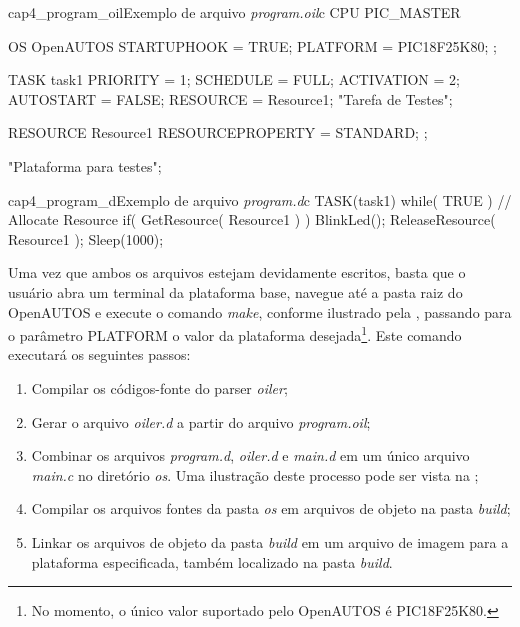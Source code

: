 \begin{algoritmo}{cap4_program_oil}{Exemplo de arquivo \emph{program.oil}}{c}
CPU PIC_MASTER {
	OS OpenAUTOS {
		STARTUPHOOK = TRUE;
		PLATFORM = PIC18F25K80;
	};
	
	TASK task1 {
		PRIORITY = 1;
		SCHEDULE = FULL;
		ACTIVATION = 2;
		AUTOSTART = FALSE;
		RESOURCE = Resource1;
	} "Tarefa de Testes";
	
	RESOURCE Resource1 {
		RESOURCEPROPERTY = STANDARD;
	};
} "Plataforma para testes";
\end{algoritmo}

\begin{algoritmo}{cap4_program_d}{Exemplo de arquivo \emph{program.d}}{c}
TASK(task1) {
	while( TRUE ) {
		// Allocate Resource
		if( GetResource( Resource1 ) ) {
			BlinkLed();
			ReleaseResource( Resource1 );
		}
		Sleep(1000);
	}	
}
\end{algoritmo}

Uma vez que ambos os arquivos estejam devidamente escritos, basta que o usuário abra um terminal da plataforma base, navegue até a pasta raiz do OpenAUTOS e execute o comando \emph{make}, conforme ilustrado pela , passando para o parâmetro PLATFORM o valor da plataforma desejada\footnote{No momento, o único valor suportado pelo OpenAUTOS é PIC18F25K80.}. Este comando executará os seguintes passos:

\begin{enumerate}
	\item Compilar os códigos-fonte do parser \emph{oiler};
	\item Gerar o arquivo \emph{oiler.d} a partir do arquivo \emph{program.oil};
	\item Combinar os arquivos \emph{program.d}, \emph{oiler.d} e \emph{main.d} em um único arquivo \emph{main.c} no diretório \emph{os}. Uma ilustração deste processo pode ser vista na ;
	\item Compilar os arquivos fontes da pasta \emph{os} em arquivos de objeto na pasta \emph{build};
	\item Linkar os arquivos de objeto da pasta \emph{build} em um arquivo de imagem para a plataforma especificada, também localizado na pasta \emph{build}.
\end{enumerate}



